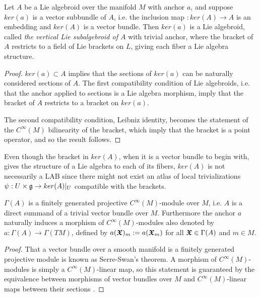 \begin{theorem} \label{theoFiberLie}
Let $A$ be a Lie algebroid over the manifold $M$ with anchor $a$, and suppose $ker(a)$ is a vector subbundle of $A$, i.e. the inclusion map $:ker(A) \to A$ is an embedding and $ker(A)$ is a vector bundle. Then $ker(a)$ %
is a Lie algebroid, called \emph{the vertical Lie subalgebroid of $A$} with trivial anchor, where the bracket of $A$ restricts to a field of Lie brackets on $L$, giving each fiber a Lie algebra structure.
\end{theorem}

\begin{proof}
$ker(a) \subset A$ implies that the sections of $ker(a)$ can be naturally considered sections of $A$. The first compatibility condition of Lie algebroids, i.e. that the anchor applied to sections is a Lie algebra morphism, imply that the bracket of $A$ restricts to a bracket on $ker(a)$.

The second compatibility condition, Leibniz identity, becomes the statement of the $C^\infty(M)$ bilinearity of the bracket, which imply that the bracket is a point operator, and so the result follows.
\end{proof}

\begin{remark}
Even though the bracket in $ker(A)$, when it is a vector bundle to begin with, gives the structure of a Lie algebra to each of its fibers, $ker(A)$ is not necessarily a LAB since there might not exist an atlas of local trivializations $\psi: U \times \mathfrak{g} \to ker(A)|_U$ compatible with the brackets.
\end{remark}

\linea 

\begin{proposition}
$\Gamma(A)$ is a finitely generated projective $C^\infty(M)$-module over $M$, i.e. $A$ is a direct summand of a trivial vector bundle over $M$. Furthermore the anchor $a$ naturally induces a morphism of $C^\infty(M)$-modules also denoted by $a: \Gamma(A) \to \Gamma(TM)$, defined by $a(\bm{\mathfrak{X}})_m := a(\bm{\mathfrak{X}}_m)$ for all $\bm{\mathfrak{X}} \in \Gamma(A)$ and $m \in M$.
\end{proposition}
\begin{proof}
That a vector bundle over a smooth manifold is a finitely generated projective module is known as Serre-Swan's theorem. A morphism of $C^\infty(M)$-modules is simply a $C^\infty(M)$-linear map, so this statement is guaranteed by the equivalence between morphisms of vector bundles over $M$ and $C^\infty(M)$-linear maps between their sections \cite{Tu2017}.
\end{proof}


